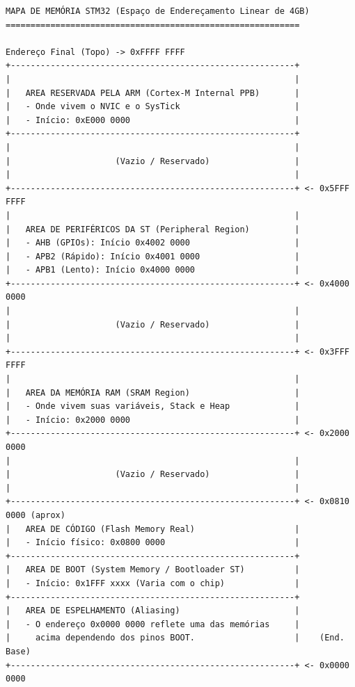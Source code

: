 \documentclass[12pt,a4paper]{article}
\begin{document}
\begin{verbatim}
MAPA DE MEMÓRIA STM32 (Espaço de Endereçamento Linear de 4GB)
===========================================================

Endereço Final (Topo) -> 0xFFFF FFFF
+---------------------------------------------------------+
|                                                         |
|   AREA RESERVADA PELA ARM (Cortex-M Internal PPB)       |
|   - Onde vivem o NVIC e o SysTick                       |
|   - Início: 0xE000 0000                                 |
+---------------------------------------------------------+
|                                                         |
|                     (Vazio / Reservado)                 |
|                                                         |
+---------------------------------------------------------+ <- 0x5FFF FFFF
|                                                         |
|   AREA DE PERIFÉRICOS DA ST (Peripheral Region)         |
|   - AHB (GPIOs): Início 0x4002 0000                     |
|   - APB2 (Rápido): Início 0x4001 0000                   |
|   - APB1 (Lento): Início 0x4000 0000                    |
+---------------------------------------------------------+ <- 0x4000 0000
|                                                         |
|                     (Vazio / Reservado)                 |
|                                                         |
+---------------------------------------------------------+ <- 0x3FFF FFFF
|                                                         |
|   AREA DA MEMÓRIA RAM (SRAM Region)                     |
|   - Onde vivem suas variáveis, Stack e Heap             |
|   - Início: 0x2000 0000                                 |
+---------------------------------------------------------+ <- 0x2000 0000
|                                                         |
|                     (Vazio / Reservado)                 |
|                                                         |
+---------------------------------------------------------+ <- 0x0810 0000 (aprox)
|   AREA DE CÓDIGO (Flash Memory Real)                    |
|   - Início físico: 0x0800 0000                          |
+---------------------------------------------------------+
|   AREA DE BOOT (System Memory / Bootloader ST)          |
|   - Início: 0x1FFF xxxx (Varia com o chip)              |
+---------------------------------------------------------+
|   AREA DE ESPELHAMENTO (Aliasing)                       |
|   - O endereço 0x0000 0000 reflete uma das memórias     |
|     acima dependendo dos pinos BOOT.                    |    (End. Base)
+---------------------------------------------------------+ <- 0x0000 0000
\end{verbatim}
\end{document}
